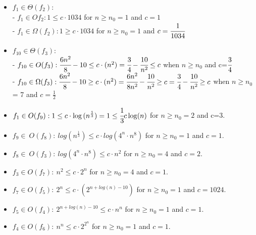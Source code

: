 \documentclass[a4paper]{article}
\theoremstyle{remarksStyle}
\theoremstyle{questionStyle}
\theoremstyle{answerStyle}
\begin{document}
\begin{itemize}
    \item   $f_{1} \in \Theta(f_{2}):$ \\
     - $f_{1} \in Of_{2} : 1 \leq c \cdot 1034$ for $n \ge n_0 =1$ and $c=1$ \\
     - $f_{1} \in \Omega(f_{2}) : 1 \ge c \cdot 1034$ for $n \ge n_0 =1$ and $c=\cfrac{1}{1034}$
    \item $f_{10} \in \Theta(f_{3}): $ \\
     - $f_{10} \in O(f_{3}) : \cfrac{6n^2}{8} -10 \leq c \cdot(n^2) = \cfrac{3}{4} - \cfrac{10}{n^2} \leq c$ when $n \ge n_{0}$ and c=$\cfrac{3}{4}$ \\
     - $f_{10} \in \Omega(f_{3}) : \cfrac{6n^2}{8} -10 \ge c \cdot(n^2) = \cfrac{6n^2}{8n^2} -\cfrac{10}{n^2} \ge c = \cfrac{3}{4} - \cfrac{10}{n^2} \ge c$ when $n \ge n_{0}$ = 7 and $c=\frac{1}{2}$ \\
     \item $f_{1} \in O(f_{9}) : 1 \le c \cdot \log{(n^{\frac{1}{3}})} = 1 \le \cfrac{1}{3}c\log({n})$ for $n \ge n_{0}=2$ and c=3. \\
    \item $f_{9} \in \ O(f_{8}): \ log(n^\frac{1}{3}) \leq c\cdot log(4^n \cdot n^8)$ for $n \ge n_0 = 1$ and $c = 1$.
    \item $f_{8} \in \ O(f_{3}): \ log(4^n \cdot n^8) \leq c \cdot n^2$ for $n \ge n_0 = 4$ and $c = 2$.
    \item $f_{3} \in O(f_{7}): \ n^2 \leq c \cdot 2^n$ for $n \ge n_0 = 4$ and $c = 1$.
    \item $f_{7} \in O(f_{5}): \ 2^n \leq c \cdot (2^{n+log(n)-10})$ for $n \ge n_0 = 1$ and $c = 1024$.
    \item $f_{5} \in O(f_{4}): \ 2^{n+log(n)-10} \leq c \cdot n^n$ for $n \ge n_0 = 1$ and $c = 1$.
    \item $f_{4} \in O(f_{6}): \ n^n \leq c \cdot 2^{2^n}$ for $n \ge n_0 = 1$ and $c = 1$.


\end{itemize} 

\newpage
\end{document}
